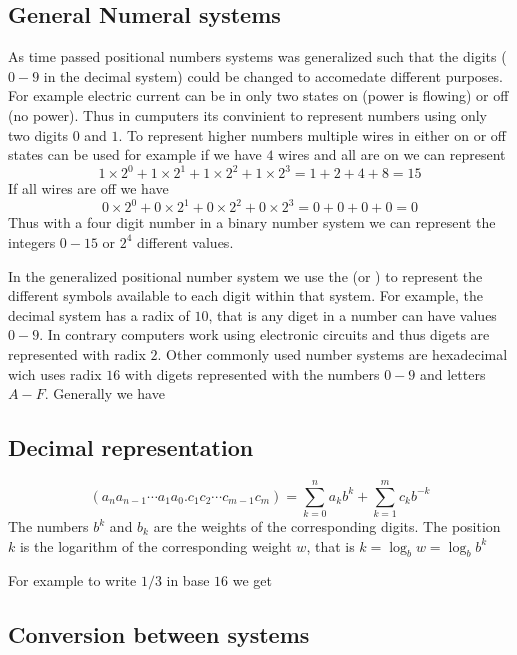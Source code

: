 \subsection{General Numeral systems}
As time passed positional numbers systems was generalized such that the digits ($0-9$ in the decimal system) could be changed to accomedate different purposes. For example electric current can be in only two states on (power is flowing) or off (no power). Thus in cumputers its convinient to represent numbers using only two digits $0$ and $1$. To represent higher numbers multiple wires in either on or off states can be used for example if we have $4$ wires and all are on we can represent
\[
  1 \times 2^0 + 1 \times 2^1 + 1 \times 2^2 + 1 \times 2^3 = 1 + 2 + 4 + 8 = 15
\]
If all wires are off we have
\[
  0 \times 2^0 + 0 \times 2^1 + 0 \times 2^2 + 0 \times 2^3 = 0 + 0 + 0 + 0 = 0
\]
Thus with a four digit number in a binary number system we can represent the integers $0-15$ or $2^4$ different values.

\myindent In the generalized positional number system we use the  (or ) to represent the different symbols available to each digit within that system. For example, the decimal system has a radix of $10$, that is any diget in a number can have values $0-9$. In contrary computers work using electronic circuits and thus digets are represented with radix $2$. Other commonly used number systems are hexadecimal wich uses radix $16$ with digets represented with the numbers $0-9$ and letters $A-F$. Generally we have

\subsection{Decimal representation}
\[
(a_{n}a_{n-1} \cdots a_{1}a_{0} . c_{1}c_{2} \cdots c_{m-1}c_{m}) =
    \sum_{k=0}^{n}a_{k}b^{k} + \sum_{k=1}^{m}c_{k}b^{-k}
\]
The numbers $b^{k}$ and $b_{k}$ are the weights of the corresponding digits. The position $k$ is the logarithm of the corresponding weight $w$, that is $k = \log_{b} w = \log_{b} b^k$


For example to write $1/3$ in base $16$ we get

\subsection{Conversion between systems}

